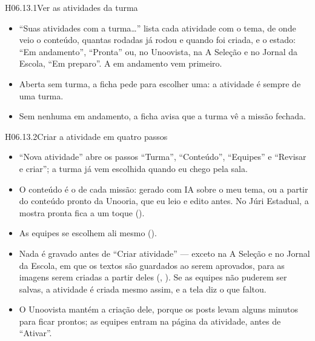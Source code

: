\begin{historia}{H06.13.1}{Ver as atividades da turma}{\pronto}
\aceite
\begin{itemize}
  \item \enquote{Suas atividades com a turma\ldots} lista cada atividade com o
    tema, de onde veio o conteúdo, quantas rodadas já rodou e quando foi criada,
    e o estado: \enquote{Em andamento}, \enquote{Pronta} ou, no Unoovista, na
    A Seleção e no Jornal da Escola, \enquote{Em preparo}. A em andamento vem primeiro.
  \item Aberta sem turma, a ficha pede para escolher uma: a atividade é sempre
    de uma turma.
  \item Sem nenhuma em andamento, a ficha avisa que a turma vê a missão fechada.
\end{itemize}
\end{historia}

\begin{historia}{H06.13.2}{Criar a atividade em quatro passos}{\pronto}
\aceite
\begin{itemize}
  \item \enquote{Nova atividade} abre os passos \enquote{Turma},
    \enquote{Conteúdo}, \enquote{Equipes} e \enquote{Revisar e criar}; a turma
    já vem escolhida quando eu chego pela sala.
  \item O conteúdo é o de cada missão: gerado com IA sobre o meu tema, ou a
    partir do conteúdo pronto da Unooria, que eu leio e edito antes. No Júri
    Estadual, a mostra pronta fica a um toque ().
  \item As equipes se escolhem ali mesmo ().
  \item Nada é gravado antes de \enquote{Criar atividade} --- exceto na A
    Seleção e no Jornal da Escola, em que os textos são guardados ao serem
    aprovados, para as imagens serem criadas a partir deles (,
    ). Se as equipes não puderem ser salvas, a atividade é criada
    mesmo assim, e a tela diz o que faltou.
  \item O Unoovista mantém a criação dele, porque os posts levam alguns
    minutos para ficar prontos; as equipes entram na página da atividade, antes
    de \enquote{Ativar}.
\end{itemize}
\end{historia}

